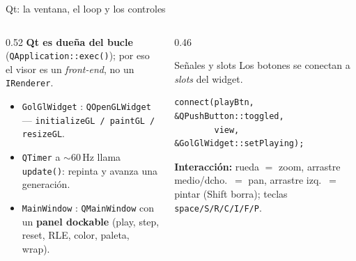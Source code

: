 \documentclass[aspectratio=169]{beamer}
\begin{document}
\begin{frame}[fragile]{Qt: la ventana, el loop y los controles}
    \begin{columns}[T]
        \begin{column}{0.52\textwidth}
            \footnotesize
            \textbf{Qt es dueña del bucle} (\texttt{QApplication::exec()}); por eso
            el visor es un \emph{front-end}, no un \texttt{IRenderer}.
            \begin{itemize}\footnotesize
                \item \texttt{GolGlWidget} : \texttt{QOpenGLWidget} ---
                      \texttt{initializeGL / paintGL / resizeGL}.
                \item \texttt{QTimer} a $\sim$60\,Hz llama \texttt{update()}:
                      repinta y avanza una generación.
                \item \texttt{MainWindow} : \texttt{QMainWindow} con un \textbf{panel
                      dockable} (play, step, reset, RLE, color, paleta, wrap).
            \end{itemize}
        \end{column}
        \begin{column}{0.46\textwidth}
            \begin{block}{Señales y slots}
                \footnotesize Los botones se conectan a \emph{slots} del widget.
            \end{block}
\begin{lstlisting}
connect(playBtn, &QPushButton::toggled,
        view, &GolGlWidget::setPlaying);
\end{lstlisting}
            \begin{highlightbox}
                \footnotesize
                \textbf{Interacción:} rueda $=$ zoom, arrastre medio/dcho.\ $=$
                pan, arrastre izq.\ $=$ pintar (Shift borra); teclas
                \texttt{space/S/R/C/I/F/P}.
            \end{highlightbox}
        \end{column}
    \end{columns}
\end{frame}
\end{document}
